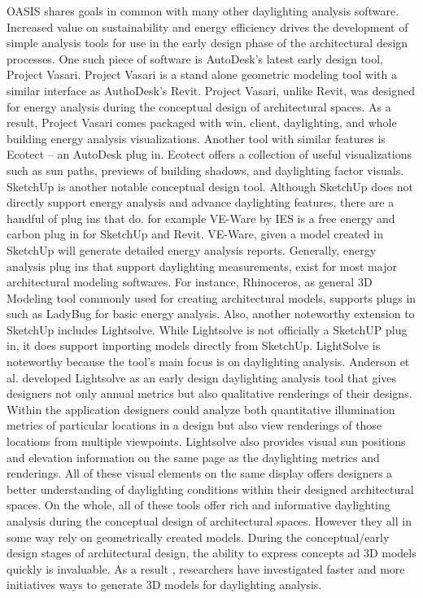 	OASIS shares goals in common with many other daylighting analysis software.
	Increased value on sustainability and energy efficiency drives the development of simple analysis tools for use in the early design phase of the architectural design processes.
	One such piece of software is AutoDesk's latest early design tool, Project Vasari\cite{vasari,autodesk}.
	Project Vasari is a stand alone geometric modeling tool with a similar interface as AuthoDesk's Revit\cite{revit}.
	Project Vasari, unlike Revit, was designed for energy analysis during the conceptual design of architectural spaces. 
	As a result, Project Vasari comes packaged with win. client, daylighting, and whole building energy analysis visualizations.
	Another tool with similar features is Ecotect -- an AutoDesk plug in\cite{ecotect}.
	Ecotect offers a collection of useful visualizations such as sun paths, previews of building shadows, and daylighting factor visuals.
	SketchUp is another notable conceptual design tool\cite{sketchup}. 
	Although SketchUp does not directly support energy analysis and advance daylighting features, there are a handful of plug ins that do.
	for example VE-Ware by IES is a free energy and carbon plug in for SketchUp and Revit\cite{veware}. 
	VE-Ware, given a model created in SketchUp will generate detailed energy analysis reports. Generally, energy analysis plug ins that support daylighting  measurements, exist for most major architectural modeling softwares.
	For instance, Rhinoceros, as general 3D Modeling tool commonly used for creating architectural models, supports plugs in such as LadyBug  for basic energy analysis\cite{rhino,ladybug}. 
	Also, another noteworthy extension to SketchUp includes Lightsolve\cite{andersen2008intuitive}.
	While Lightsolve is not officially a SketchUP plug in, it does support importing models directly from SketchUp.
	LightSolve is noteworthy because the tool's main focus is on daylighting analysis.
	Anderson et al. developed Lightsolve as an early design daylighting analysis tool that gives designers not only annual metrics but also qualitative renderings of their designs. 
	Within the application designers could analyze both quantitative illumination metrics of particular locations in a design but also view renderings of those locations from multiple viewpoints.
	Lightsolve also provides visual sun positions and elevation information on the same page as the daylighting metrics and renderings. 
	All of these visual elements on the same display offers designers a better understanding of daylighting conditions within their designed architectural spaces\cite{andersen2011informing}. 
	On the whole, all of these tools offer rich and informative daylighting analysis during the conceptual  design of architectural spaces.
	However they all in some way rely on geometrically created models.
	During the conceptual/early design stages of architectural design, the ability to express concepts ad 3D models quickly is invaluable.
	As a result , researchers have investigated faster and more initiatives ways to generate 3D models for daylighting analysis.